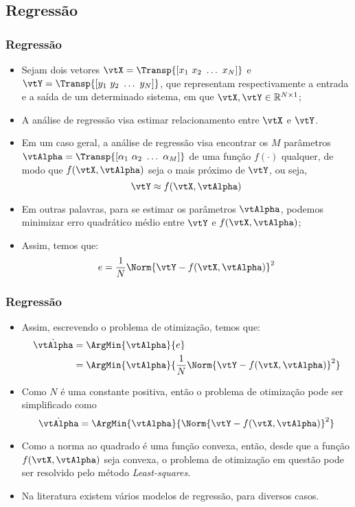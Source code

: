 \subsection{Regressão}

\begin{frame}
	\frametitle{Regressão}
	\begin{itemize}
		\item Sejam dois vetores $\vtX = \Transp{\left[x_1 \,\, x_2 \,\, \dots \,\, x_N \right]}$ e $\vtY = \Transp{\left[y_1 \,\, y_2 \,\, \dots \,\, y_N \right]}$, que representam respectivamente a entrada e a saída de um determinado sistema, em que $\vtX, \vtY \in \mathbb{R}^{N \times 1}$;
		\item A análise de regressão visa estimar relacionamento entre $\vtX$ e $\vtY$.
		\item Em um caso geral, a análise de regressão visa encontrar os $M$ parâmetros $\vtAlpha = \Transp{\left[\alpha_1 \,\, \alpha_2 \,\, \dots \,\, \alpha_M \right]}$ de uma função $f(\cdot)$ qualquer, de modo que $f(\vtX, \vtAlpha)$ seja o mais próximo de $\vtY$, ou seja,
		\[
			\vtY \approx f(\vtX, \vtAlpha)
		\]
		\item Em outras palavras, para se estimar os parâmetros $\vtAlpha$, podemos minimizar erro quadrático médio entre $\vtY$ e $f(\vtX, \vtAlpha)$;
		\item Assim, temos que:
		\[
			e = \dfrac{1}{N}\Norm{\vtY - f(\vtX, \vtAlpha)}^2
		\]
	\end{itemize}
\end{frame}

\begin{frame}
	\frametitle{Regressão}
	\begin{itemize}		
		\item Assim, escrevendo o problema de otimização, temos que:
		\begin{align*}
			\dot{\vtAlpha} &= \ArgMin{\vtAlpha}{e} \\
			&= \ArgMin{\vtAlpha}{\dfrac{1}{N}\Norm{\vtY - f(\vtX, \vtAlpha)}^2}
		\end{align*}
		\item Como $N$ é uma constante positiva, então o problema de otimização pode ser simplificado como
		\[
			\dot{\vtAlpha} = \ArgMin{\vtAlpha}{\Norm{\vtY - f(\vtX, \vtAlpha)}^2}
		\]
		\item Como a norma ao quadrado é uma função convexa, então, desde que a função $f(\vtX, \vtAlpha)$ seja convexa, o problema de otimização em questão pode ser resolvido pelo método \textit{Least-squares}.
		\item Na literatura existem vários modelos de regressão, para diversos casos.
	\end{itemize}
\end{frame}

